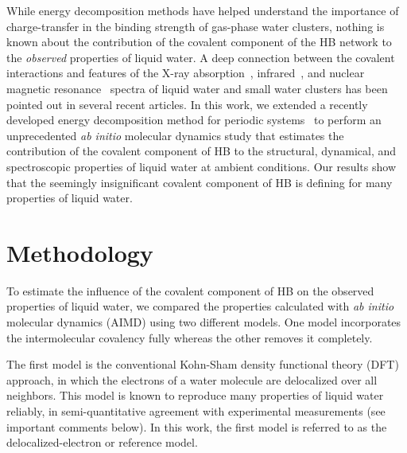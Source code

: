\documentclass[journal=jacsat,manuscript=article]{achemso}
\begin{document}
While energy decomposition methods have helped understand the importance of charge-transfer in the binding strength of gas-phase water clusters, nothing is known about the contribution of the covalent component of the HB network to the \emph{observed} properties of liquid water. 
A deep connection between the covalent interactions and features of the X-ray absorption~\cite{fransson2016x, NatureComm2013}, infrared~\cite{JPCL2013, Faraday2011, lenz2006theoretical}, and nuclear magnetic resonance~\cite{NatureComm2015} spectra of liquid water and small water clusters has been pointed out in several recent articles. 
In this work, we extended a recently developed energy decomposition method for periodic systems~\cite{Khaliullin2013JCTC} to perform an unprecedented \emph{ab initio} molecular dynamics study that estimates the contribution of the covalent component of HB to the structural, dynamical, and spectroscopic properties of liquid water at ambient conditions. 
Our results show that the seemingly insignificant covalent component of HB is defining for many properties of liquid water. 

\section{Methodology}


To estimate the influence of the covalent component of HB on the observed properties of liquid water, we compared the properties calculated with \emph{ab initio} molecular dynamics (AIMD) using two different models. 
One model incorporates the intermolecular covalency fully whereas the other removes it completely.

The first model is the conventional Kohn-Sham density functional theory (DFT) approach, in which the electrons of a water molecule are delocalized over all neighbors. 
This model is known to reproduce many properties of liquid water reliably, in semi-quantitative agreement with experimental measurements (see important comments below). 
In this work, the first model is referred to as the delocalized-electron or reference model. 
\end{document}
